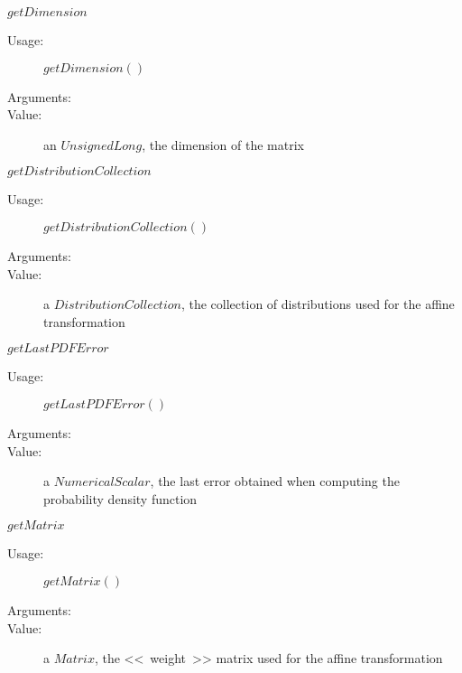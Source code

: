 \begin{description}
\begin{description}
  \item $getDimension$
    \begin{description}
    \item[Usage:]  $getDimension()$
    \item[Arguments:]  \strut
    \item[Value:] an $UnsignedLong$, the dimension of the matrix
    \end{description}

  \item $getDistributionCollection$
    \begin{description}
    \item[Usage:]  $getDistributionCollection()$
    \item[Arguments:]  \strut
    \item[Value:] a $DistributionCollection$, the collection of distributions used for the affine transformation
    \end{description}

  \item $getLastPDFError$
    \begin{description}
    \item[Usage:]  $getLastPDFError()$
    \item[Arguments:]  \strut
    \item[Value:] a $NumericalScalar$, the last error obtained when computing the probability density function
    \end{description}

  \item $getMatrix$
    \begin{description}
    \item[Usage:]  $getMatrix()$
    \item[Arguments:]  \strut
    \item[Value:] a $Matrix$, the <<~weight~>> matrix used for the affine transformation
    \end{description}


\end{description}
\end{description}
